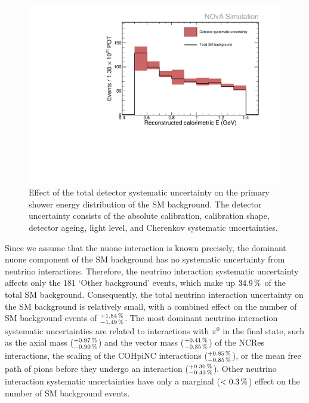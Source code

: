 \begin{figure}[hbtp]
\centering
\includegraphics[width=.9\textwidth]{Plots/NuMM/SystShifts_detSysts_Full_Graph.pdf}
\caption[Detector systematic uncertainties]{Effect of the total detector systematic uncertainty on the primary shower energy distribution of the \acrshort{SM} background. The detector uncertainty consists of the absolute calibration, calibration shape, detector ageing, light level, and Cherenkov systematic uncertainties.}
\label{fig:NuMMDetSysts}
\end{figure}

Since we assume that the \gls{nuone} interaction is known precisely, the dominant \gls{nuone} component of the \gls{SM} background has no systematic uncertainty from neutrino interactions. Therefore, the neutrino interaction systematic uncertainty affects only the $181$ `Other background' events, which make up $\unit[34.9]{\%}$ of the total \gls{SM} background. Consequently, the total neutrino interaction uncertainty on the \gls{SM} background is relatively small, with a combined effect on the number of \gls{SM} background events of $^{+\unit[1.54]{\%}}_{-\unit[1.49]{\%}}$.
The most dominant neutrino interaction systematic uncertainties are related to interactions with $\pi^0$ in the final state,  such as the axial mass ($^{\unit[+0.97]{\%}}_{\unit[-0.90]{\%}}$) and the vector mass ($^{\unit[+0.41]{\%}}_{\unit[-0.35]{\%}}$) of the \gls{NC}\gls{Res} interactions, the scaling of the \gls{COHpi}\gls{NC} interactions ($^{\unit[+0.85]{\%}}_{\unit[-0.85]{\%}}$), or the mean free path of pions before they undergo an interaction ($^{\unit[+0.30]{\%}}_{\unit[-0.43]{\%}}$). Other neutrino interaction systematic uncertainties have only a marginal ($<\unit[0.3]{\%}$) effect on the number of \gls{SM} background events.

